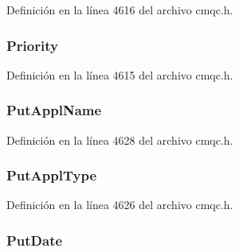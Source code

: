 Definición en la línea 4616 del archivo cmqc.\+h.

\hypertarget{structtag_m_q_m_d2_a72c542b9e2952a489df0cb84755c1fa6}{}
\subsubsection[{Priority}]{ Priority}\label{structtag_m_q_m_d2_a72c542b9e2952a489df0cb84755c1fa6}


Definición en la línea 4615 del archivo cmqc.\+h.

\hypertarget{structtag_m_q_m_d2_a7195390be27f384ef0ab0d0f9053d462}{}
\subsubsection[{Put\+Appl\+Name}]{ Put\+Appl\+Name}\label{structtag_m_q_m_d2_a7195390be27f384ef0ab0d0f9053d462}


Definición en la línea 4628 del archivo cmqc.\+h.

\hypertarget{structtag_m_q_m_d2_a6d9e0e0fe9075017c939213948c747dc}{}
\subsubsection[{Put\+Appl\+Type}]{ Put\+Appl\+Type}\label{structtag_m_q_m_d2_a6d9e0e0fe9075017c939213948c747dc}


Definición en la línea 4626 del archivo cmqc.\+h.

\hypertarget{structtag_m_q_m_d2_add3e7fe139edfa323295d6c7bc764cc5}{}
\subsubsection[{Put\+Date}]{ Put\+Date}\label{structtag_m_q_m_d2_add3e7fe139edfa323295d6c7bc764cc5}


